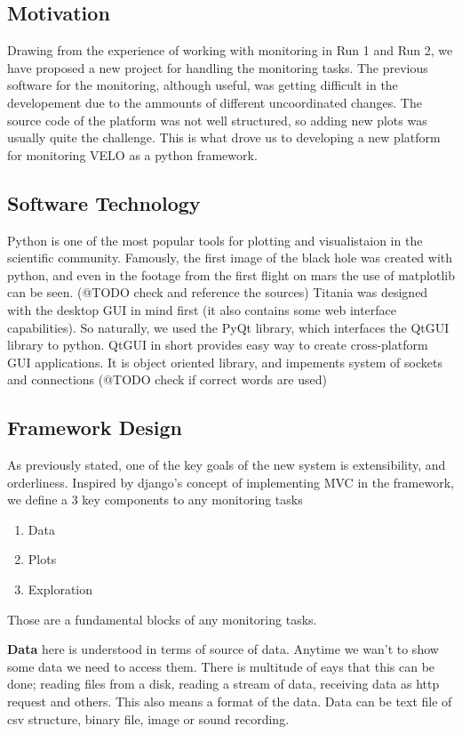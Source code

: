 \subsection{Motivation}
Drawing from the experience of working with monitoring in Run 1 and Run 2, we have proposed a new project for handling the monitoring tasks.
The previous software for the monitoring, although useful, was getting difficult in the developement due to the ammounts of different uncoordinated changes.
The source code of the platform was not well structured, so adding new plots was usually quite the challenge.
This is what drove us to developing a new platform for monitoring VELO as a python framework.

\subsection{Software Technology}

Python is one of the most popular tools for plotting and visualistaion in the scientific community.
Famously, the first image of the black hole was created with python, and even in the footage from the first flight on mars the use of matplotlib can be seen.
(@TODO check and reference the sources)
Titania was designed with the desktop GUI in mind first (it also contains some web interface capabilities).
So naturally, we used the PyQt library, which interfaces the QtGUI library to python.
QtGUI in short provides easy way to create cross-platform GUI applications.
It is object oriented library, and impements system of sockets and connections (@TODO check if correct words are used)

\subsection{Framework Design}

As previously stated, one of the key goals of the new system is extensibility, and orderliness.
Inspired by django's concept of implementing MVC in the framework, we define a 3 key components to any monitoring tasks

\begin{enumerate}
  \item Data
  \item Plots
  \item Exploration
\end{enumerate}

Those are a fundamental blocks of any monitoring tasks.


\textbf{Data} here is understood in terms of source of data. Anytime we wan't to show some data we need to access them.
There is multitude of eays that this can be done; reading files from a disk, reading a stream of data, receiving data as http request and others.
This also means a format of the data. Data can be text file of csv structure, binary file, image or sound recording.

